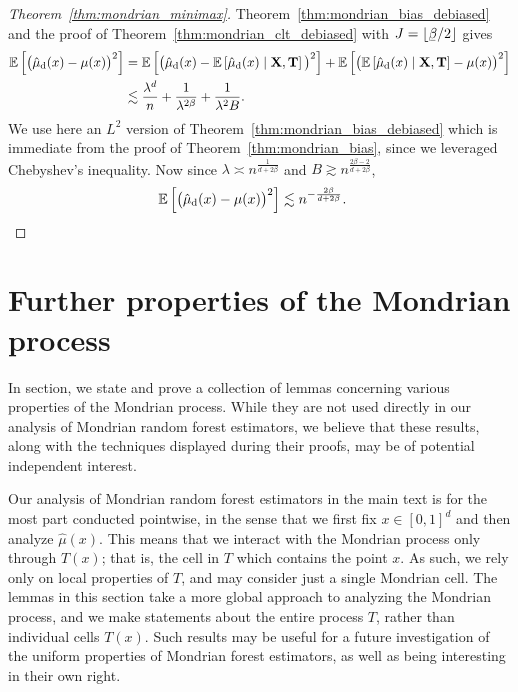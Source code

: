 \begin{proof}[Theorem~\ref{thm:mondrian_minimax}]

  Theorem~\ref{thm:mondrian_bias_debiased}
  and the proof of Theorem~\ref{thm:mondrian_clt_debiased}
  with $J = \lfloor \flbeta / 2 \rfloor$ gives
  \begin{align*}
    \mathbb{E} \left[
      \big(
        \hat \mu_{\mathrm{d}}(x)
        - \mu(x)
      \big)^2
    \right]
    &=
    \mathbb{E} \left[
      \big(
        \hat \mu_{\mathrm{d}}(x)
        - \mathbb{E} \left[ \hat \mu_{\mathrm{d}}(x) \mid \mathbf{X}, \mathbf{T} \right]
      \big)^2
    \right]
    + \mathbb{E} \left[
      \big(
        \mathbb{E} \left[ \hat \mu_{\mathrm{d}}(x) \mid \mathbf{X}, \mathbf{T} \right]
        - \mu(x)
      \big)^2
    \right] \\
    &\lesssim
    \frac{\lambda^d}{n}
    + \frac{1}{\lambda^{2\beta}}
    + \frac{1}{\lambda^2 B}.
  \end{align*}
  We use here an $L^2$ version of Theorem~\ref{thm:mondrian_bias_debiased}
  which is immediate from the proof of Theorem~\ref{thm:mondrian_bias},
  since we leveraged Chebyshev's inequality. Now since
  $\lambda \asymp n^{\frac{1}{d + 2 \beta}}$ and
  $B \gtrsim n^{\frac{2 \beta - 2}{d + 2 \beta}}$,
  \begin{align*}
    \mathbb{E} \left[
      \big(
        \hat \mu_{\mathrm{d}}(x)
        - \mu(x)
      \big)^2
    \right]
    &\lesssim
    n^{-\frac{2\beta}{d + 2 \beta}}.
  \end{align*}
\end{proof}

\section{Further properties of the Mondrian process}

In section, we state and prove a collection of lemmas concerning
various properties of the Mondrian process. While they are not used directly
in our analysis of Mondrian random forest estimators, we believe that
these results, along with the techniques displayed during their proofs,
may be of potential independent interest.

Our analysis of Mondrian random forest estimators in the main text
is for the most part
conducted pointwise, in the sense that we first fix $x \in [0,1]^d$
and then analyze $\hat\mu(x)$. This means that we interact with the Mondrian
process
only through $T(x)$; that is, the cell in $T$ which contains the point $x$.
As such, we rely only on local properties of $T$, and may consider just a
single Mondrian cell. The lemmas in this section take a more global approach
to analyzing the Mondrian process, and we make statements about the
entire process $T$, rather than individual cells $T(x)$.
Such results may be useful for a future investigation of the uniform
properties of Mondrian forest estimators, as well as
being interesting in their own right.

